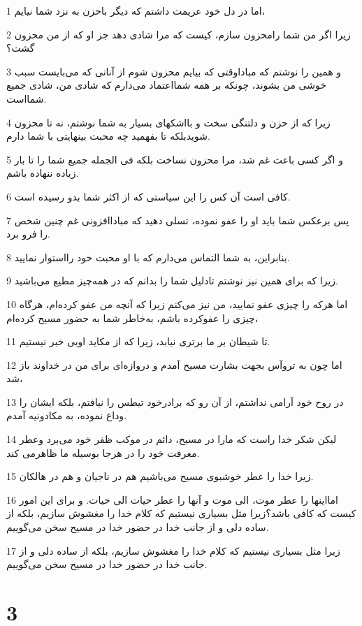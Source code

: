 \par 1 اما در دل خود عزیمت داشتم که دیگر باحزن به نزد شما نیایم،
\par 2 زیرا اگر من شما رامحزون سازم، کیست که مرا شادی دهد جز او که از من محزون گشت؟
\par 3 و همین را نوشتم که مباداوقتی که بیایم محزون شوم از آنانی که می‌بایست سبب خوشی من بشوند، چونکه بر همه شمااعتماد می‌دارم که شادی من، شادی جمیع شمااست.
\par 4 زیرا که از حزن و دلتنگی سخت و بااشکهای بسیار به شما نوشتم، نه تا محزون شویدبلکه تا بفهمید چه محبت بینهایتی با شما دارم.
\par 5 و اگر کسی باعث غم شد، مرا محزون نساخت بلکه فی الجمله جمیع شما را تا بار زیاده ننهاده باشم.
\par 6 کافی است آن کس را این سیاستی که از اکثر شما بدو رسیده است.
\par 7 پس برعکس شما باید او را عفو نموده، تسلی دهید که مباداافزونی غم چنین شخص را فرو برد.
\par 8 بنابراین، به شما التماس می‌دارم که با او محبت خود رااستوار نمایید.
\par 9 زیرا که برای همین نیز نوشتم تادلیل شما را بدانم که در همه‌چیز مطیع می‌باشید.
\par 10 اما هرکه را چیزی عفو نمایید، من نیز می‌کنم زیرا که آنچه من عفو کرده‌ام، هرگاه چیزی را عفوکرده باشم، به‌خاطر شما به حضور مسیح کرده‌ام،
\par 11 تا شیطان بر ما برتری نیابد، زیرا که از مکاید اوبی خبر نیستیم.
\par 12 اما چون به تروآس بجهت بشارت مسیح آمدم و دروازه‌ای برای من در خداوند باز شد،
\par 13 در روح خود آرامی نداشتم، از آن رو که برادرخود تیطس را نیافتم، بلکه ایشان را وداع نموده، به مکادونیه آمدم.
\par 14 لیکن شکر خدا راست که مارا در مسیح، دائم در موکب ظفر خود می‌برد وعطر معرفت خود را در هرجا بوسیله ما ظاهرمی کند.
\par 15 زیرا خدا را عطر خوشبوی مسیح می‌باشیم هم در ناجیان و هم در هالکان.
\par 16 امااینها را عطر موت، الی موت و آنها را عطر حیات الی حیات. و برای این امور کیست که کافی باشد؟زیرا مثل بسیاری نیستیم که کلام خدا را مغشوش سازیم، بلکه از ساده دلی و از جانب خدا در حضور خدا در مسیح سخن می‌گوییم.
\par 17 زیرا مثل بسیاری نیستیم که کلام خدا را مغشوش سازیم، بلکه از ساده دلی و از جانب خدا در حضور خدا در مسیح سخن می‌گوییم.

\chapter{3}

